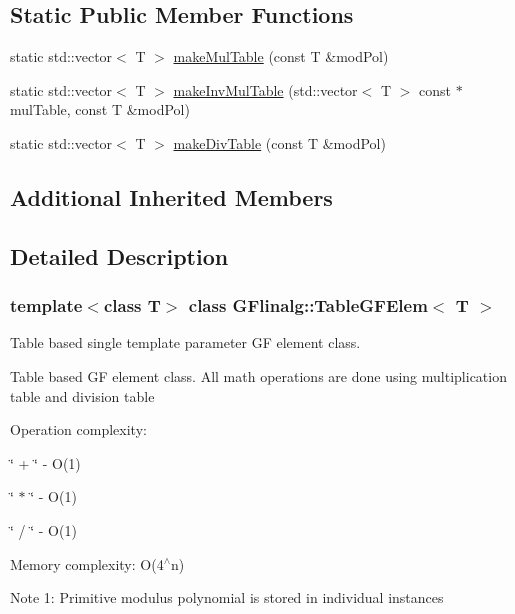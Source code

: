 \subsection*{Static Public Member Functions}
\begin{DoxyCompactItemize}
\item 
static std\+::vector$<$ T $>$ \mbox{\hyperlink{class_g_flinalg_1_1_table_g_f_elem_abcf511c0564ce0dfba2da3fb412360e3}{make\+Mul\+Table}} (const T \&mod\+Pol)
\item 
static std\+::vector$<$ T $>$ \mbox{\hyperlink{class_g_flinalg_1_1_table_g_f_elem_ab8316e926ccc41e83ff3c8aab82438ee}{make\+Inv\+Mul\+Table}} (std\+::vector$<$ T $>$ const $\ast$mul\+Table, const T \&mod\+Pol)
\item 
static std\+::vector$<$ T $>$ \mbox{\hyperlink{class_g_flinalg_1_1_table_g_f_elem_ac7651502d27e64293acbe7b30841c10d}{make\+Div\+Table}} (const T \&mod\+Pol)
\end{DoxyCompactItemize}
\subsection*{Additional Inherited Members}


\subsection{Detailed Description}
\subsubsection*{template$<$class T$>$\newline
class G\+Flinalg\+::\+Table\+G\+F\+Elem$<$ T $>$}

Table based single template parameter GF element class. 

Table based GF element class. All math operations are done using multiplication table and division table

Operation complexity\+:
\begin{DoxyItemize}
\item \char`\"{} + \char`\"{} -\/ O(1)
\item \char`\"{} $\ast$ \char`\"{} -\/ O(1)
\item \char`\"{} / \char`\"{} -\/ O(1)
\end{DoxyItemize}

Memory complexity\+: O(4$^\wedge$n)

Note 1\+: Primitive modulus polynomial is stored in individual instances

